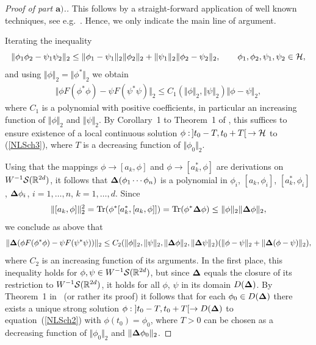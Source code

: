 \documentclass[pdftex]{sigma}
\begin{document}
\begin{proof}[Proof of part $\boldsymbol{a)}$.]  This follows by a straight-forward
application of well known techniques, see e.g.~\cite{Reed}. Hence, we
only indicate the main line of argument.

Iterating the inequality
\[
\Vert \phi_1\phi_2- \psi_1\psi_2\Vert_2 \leq
\Vert\phi_1-\psi_1\Vert_2\Vert\phi_2\Vert_2+\Vert\psi_1\Vert_2\Vert\phi_2-\psi_2\Vert_2,\qquad
 \phi_1, \phi_2, \psi_1, \psi_2\in{\cal H},
\]
and using $\Vert\phi\Vert _2=\Vert \phi^*\Vert_2$ we obtain
\begin{gather}\label{H1}
\Vert\phi F(\phi^*\phi)-\psi F(\psi^*\psi)\Vert_2 \leq C_1(
\Vert\phi\Vert_2,\Vert\psi\Vert_2)\Vert\phi-\psi\Vert_2  ,
\end{gather}
where $C_1$ is a polynomial with positive coef\/f\/icients, in particular an
increasing function of $\Vert\phi\Vert_2$ and $\Vert\psi\Vert_2$.
By Corollary~1 to Theorem~1 of \cite{Reed}, this suf\/f\/ices to ensure existence of a
local continuous solution $\phi: \,]t_0-T,t_0+T[\, \to {\cal H}$ to (\ref{NLSch3}), where $T$
is a decreasing function of $\Vert\phi_0\Vert_2$.

Using that the mappings $\phi\to [a_k,\phi]$ and  $\phi\to
[a^*_k,\phi]$ are derivations on $W^{-1}{\cal S}(\mathbb R^{2d})$, it
follows that ${{\bf\Delta}}(\phi_1\cdots\phi_n)$ is a polynomial in
$\phi_i$, $[a_k,\phi_i]$, $[a_k^*,\phi_i]$,
${\bf\Delta}\phi_i$, $i=1,\dots,n$, $k=1,\dots,d$. Since
\begin{gather}\label{est1}
\Vert[a_k,\phi]\Vert^2_2 =
\mbox{Tr}(\phi^*[a_k^*,[a_k,\phi]])=
\mbox{Tr}(\phi^*{{\bf\Delta}}\phi)\leq \Vert\phi\Vert_2\Vert{{\bf\Delta}}\phi\Vert_2 ,
\end{gather}
we conclude as above that
\begin{gather*}%
\Vert {\bf\Delta}(\phi F(\phi^*\phi)-\psi F(\psi^*\psi))\Vert_2 \leq
C_2(\Vert\phi\Vert_2,\Vert\psi\Vert_2,\Vert{\bf\Delta}\phi\Vert_2,\Vert{\bf\Delta}\psi\Vert_2)(\Vert\phi-\psi\Vert_2
+ \Vert{\bf\Delta}(\phi-\psi)\Vert_2),
\end{gather*}
where $C_2$ is an increasing function of its arguments. In the f\/irst
place, this inequality holds for $\phi,\psi\in W^{-1}{\cal S}(\mathbb
R^{2d})$, but since ${\bf\Delta}$ equals the closure of its restriction to $W^{-1}{\cal S}(\mathbb R^{2d})$,
it holds for all $\phi$, $\psi$ in its domain $D({\bf\Delta})$. By Theorem~1 in~\cite{Reed} (or rather its proof) it follows that for each $\phi_0\in
D({\bf\Delta})$ there exists a unique strong solution
$\phi: \; ]t_0-T,t_0+T[\to D({\bf\Delta})$ to equation~(\ref{NLSch2}) with $\phi(t_0)=\phi_0$, where $T>0$ can be
chosen as a decreasing function of $\Vert\phi_0\Vert_2$ and
$\Vert{\bf\Delta}\phi_0\Vert_2$.


\end{proof}
\end{document}
